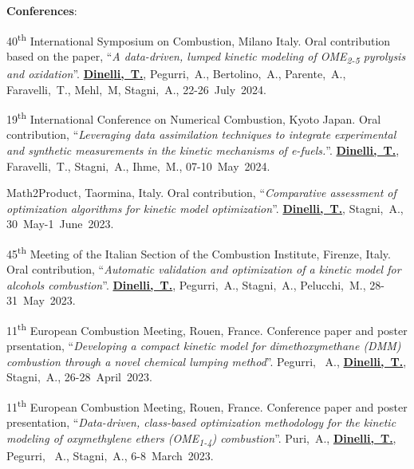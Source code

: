 \textbf{Conferences}:
\begin{etaremune}
   \item
      40\textsuperscript{th} International Symposium on Combustion, Milano Italy. Oral
      contribution based on the paper, ``{\it A data-driven, lumped kinetic modeling of
      OME\textsubscript{2-5} pyrolysis and oxidation}''. {\bf \underline{Dinelli,~T.}},
      Pegurri,~A., Bertolino,~A., Parente,~A., Faravelli,~T., Mehl,~M, Stagni,~A.,
      22-26~July~2024.

   \item
      19\textsuperscript{th} International Conference on Numerical Combustion, Kyoto
      Japan. Oral contribution, ``{\it Leveraging data assimilation techniques to
      integrate experimental and synthetic measurements in the kinetic mechanisms of
      e-fuels.}''. {\bf \underline{Dinelli,~T.}}, Faravelli,~T., Stagni,~A., Ihme,~M.,
      07-10~May~2024.

   \item
      Math2Product, Taormina, Italy. Oral contribution, ``{\it Comparative
      assessment of optimization algorithms for kinetic model optimization}''.
      {\bf \underline{Dinelli,~T.}}, Stagni,~A.,
      30~May-1~June~2023.

   \item
      45\textsuperscript{th} Meeting of the Italian Section of the Combustion Institute,
      Firenze, Italy. Oral contribution, ``{\it Automatic validation and optimization
      of a kinetic model for alcohols combustion}''. {\bf \underline{Dinelli,~T.}},
      Pegurri,~A., Stagni,~A., Pelucchi,~M.,
      28-31~May~2023.

   \item
      11\textsuperscript{th} European Combustion Meeting, Rouen, France. Conference paper
      and poster prsentation, ``{\it Developing a compact kinetic model for
      dimethoxymethane (DMM) combustion through a novel chemical lumping method}''.
      Pegurri, ~A., {\bf \underline{Dinelli,~T.}}, Stagni,~A.,
      26-28~April~2023.

   \item
      11\textsuperscript{th} European Combustion Meeting, Rouen, France. Conference paper
      and poster presentation, ``{\it Data-driven, class-based optimization methodology
      for the kinetic modeling of oxymethylene ethers (OME\textsubscript{1-4}) combustion}''.
      Puri,~A., {\bf \underline{Dinelli,~T.}}, Pegurri, ~A., Stagni,~A.,
      6-8~March~2023.


\end{etaremune}
